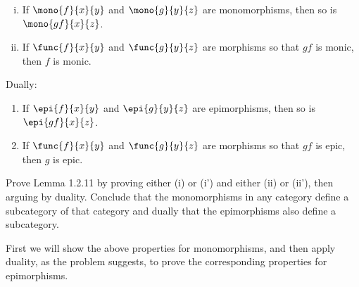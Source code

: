 \documentclass[main.tex]{subfiles}
\begin{document}
\begin{lemma}\leavevmode
	\begin{enumerate}[(i)]
		\item If \(\mono{f}{x}{y}\) and \(\mono{g}{y}{z}\) are monomorphisms,
			then so is \(\mono{gf}{x}{z}\).

		\item If \(\func{f}{x}{y}\) and \(\func{g}{y}{z}\) are morphisms so
			that \(gf\) is monic, then \(f\) is monic.
	\end{enumerate}
	Dually:
	\begin{enumerate}[(i')]
		\item If \(\epi{f}{x}{y}\) and \(\epi{g}{y}{z}\) are epimorphisms,
			then so is \(\epi{gf}{x}{z}\).

		\item If \(\func{f}{x}{y}\) and \(\func{g}{y}{z}\) are morphisms so
			that \(gf\) is epic, then \(g\) is epic.
	\end{enumerate}
\end{lemma}

\begin{exercise}
	Prove Lemma 1.2.11 by proving either (i) or (i') and either (ii) or (ii'),
	then arguing by duality. Conclude that the monomorphisms in any category
	define a subcategory of that category and dually that the epimorphisms also
	define a subcategory.
\end{exercise}

First we will show the above properties for monomorphisms, and then apply
duality, as the problem suggests, to prove the corresponding properties for
epimorphisms.
\end{document}

